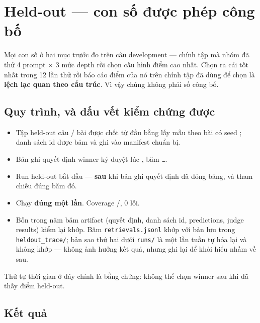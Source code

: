 \section{Held-out --- con số được phép công bố}

Mọi con số ở hai mục trước đo trên \NumNDev{} câu development --- chính tập mà
nhóm đã thử 4 prompt $\times$ 3 mức depth rồi chọn cấu hình điểm cao nhất. Chọn
ra cái tốt nhất trong 12 lần thử rồi báo cáo điểm của nó trên chính tập đã dùng
để chọn là \textbf{lệch lạc quan theo cấu trúc}. Vì vậy chúng không phải số
công bố.

\subsection{Quy trình, và dấu vết kiểm chứng được}

\begin{itemize}\small
  \item Tập held-out \NumNHeldout{} câu / \NumNArticles{} bài được chốt từ đầu
        bằng lấy mẫu theo bài có seed \NumHeldoutSeed{}; danh sách id được băm
        và ghi vào manifest chuẩn bị.
  \item Bản ghi quyết định winner ký duyệt lúc \NumWinnerApprovedAt{}, băm
        \texttt{\NumHoDecisionSha\ldots}.
  \item Run held-out bắt đầu \NumHoStartedAt{} --- \textbf{sau} khi bản ghi
        quyết định đã đóng băng, và tham chiếu đúng băm đó.
  \item Chạy \textbf{đúng một lần}. Coverage \NumNHeldout{}/\NumNHeldout{}, 0 lỗi.
  \item Bốn trong năm băm artifact (quyết định, danh sách id, predictions,
        judge results) kiểm lại khớp. Băm \texttt{retrievals.jsonl} khớp với bản
        lưu trong \texttt{heldout\_trace/}; bản sao thứ hai dưới \texttt{runs/}
        là một lần tuần tự hóa lại và không khớp --- không ảnh hưởng kết quả,
        nhưng ghi lại để khỏi hiểu nhầm về sau.
\end{itemize}

Thứ tự thời gian ở đây chính là bằng chứng: không thể chọn winner sau khi đã
thấy điểm held-out.

\subsection{Kết quả}

